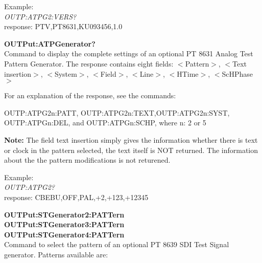 Example:\\
\textit{OUTP:ATPG2:VERS?}\\
response: PTV,PT8631,KU093456,1.0

\textbf{OUTPut:ATPGenerator?}\\
Command to display the complete settings of an optional PT 8631 Analog Test Pattern Generator. The response contains eight fields: 
$<$Pattern$>$, $<$Text insertion$>$, $<$System$>$, $<$Field$>$, $<$Line$>$, $<$HTime$>$, $<$ScHPhase$>$

For an explanation of the response, see the commands: 

OUTP:ATPG2n:PATT, OUTP:ATPG2n:TEXT,OUTP:ATPG2n:SYST, OUTP:ATPGn:DEL, and OUTP:ATPGn:SCHP, where n: 2 or 5

\textbf{Note:} The field text insertion simply gives the information whether there is text or clock in the pattern selected, the text itself is NOT returned. The information about the the pattern modifications is not returened.

Example:\\
\textit{OUTP:ATPG2?}\\
response: CBEBU,OFF,PAL,+2,+123,+12345

\textbf{OUTPut:STGenerator2:PATTern}\\
\textbf{OUTPut:STGenerator3:PATTern}\\
\textbf{OUTPut:STGenerator4:PATTern}\\
Command to select the pattern of an optional PT 8639 SDI Test Signal generator. Patterns available are:

